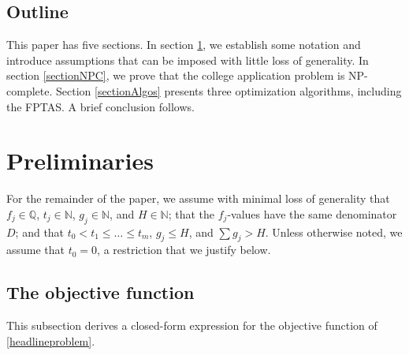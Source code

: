 \subsection{Outline}

This paper has five sections. In section \ref{sectionPrelims}, we establish some notation and introduce assumptions that can be imposed with little loss of generality. In section \ref{sectionNPC}, we prove that the college application problem is NP-complete. Section \ref{sectionAlgos} presents three optimization algorithms, including the FPTAS. A brief conclusion follows.

\section{Preliminaries} \label{sectionPrelims}

For the remainder of the paper, we assume with minimal loss of generality that $f_j \in \mathbb{Q}$, $t_j \in \mathbb{N}$, $g_j \in \mathbb{N}$, and $H \in \mathbb{N}$; that the $f_j$-values have the same denominator $D$; and that $t_0 < t_1 \leq \dots \leq t_m$, $g_j \leq H$, and $\sum g_j > H$. Unless otherwise noted, we assume that $t_0 = 0$, a restriction that we justify below.

\subsection{The objective function} \label{sectionObjective}

This subsection derives a closed-form expression for the objective function of \eqref{headlineproblem}.

